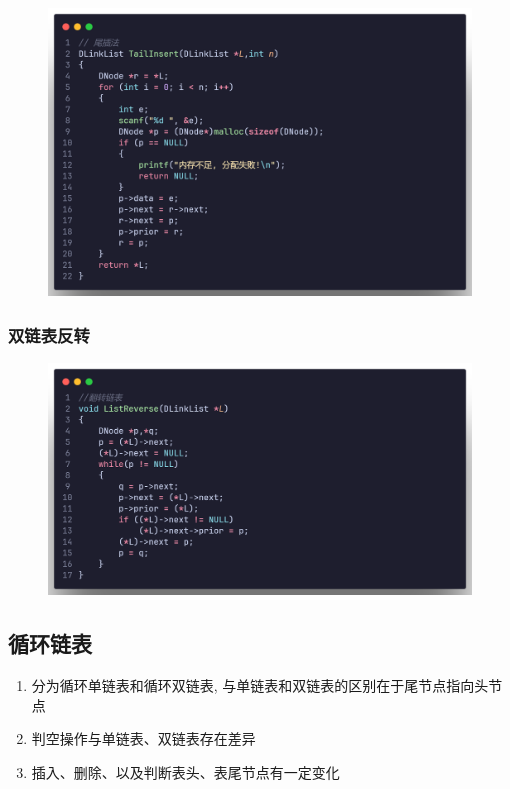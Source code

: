 \begin{figure}[H]
    \centering
    \includegraphics[scale=0.2]{"figure/Note/LinearList/DlTInsert.png"}
\end{figure}

\subsubsection{双链表反转}

\begin{figure}[H]
    \centering
    \includegraphics[scale=0.2]{"figure/Note/LinearList/DlReverse.png"}
\end{figure}


\subsection{循环链表}
\begin{definition}[循环链表]
    \begin{enumerate}
        \item 分为循环单链表和循环双链表, 与单链表和双链表的区别在于尾节点指向头节点
        \item 判空操作与单链表、双链表存在差异
        \item 插入、删除、以及判断表头、表尾节点有一定变化
    \end{enumerate}
\end{definition}

